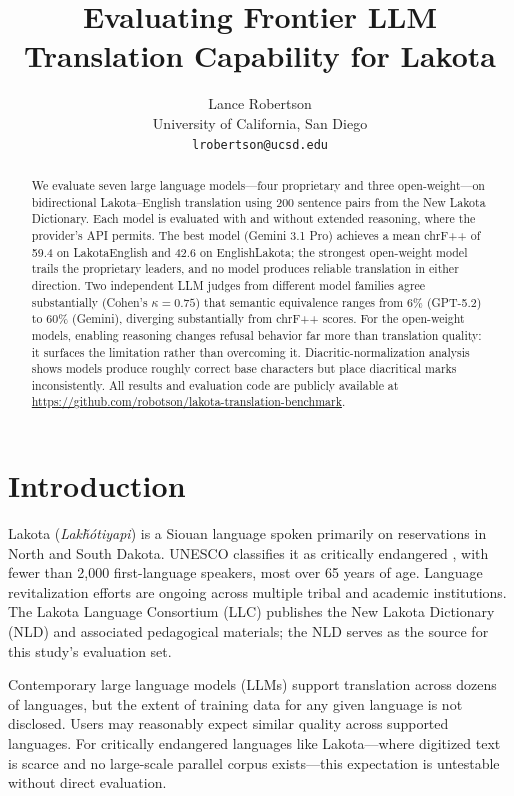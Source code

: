 \documentclass[11pt]{article}
\title{Evaluating Frontier LLM Translation Capability for Lakota}
\author{Lance Robertson \\
  University of California, San Diego \\
  \texttt{lrobertson@ucsd.edu}}
\newcommand{\lak}[1]{\textit{#1}}
\begin{document}
\maketitle

\begin{abstract}
We evaluate seven large language models---four proprietary and three open-weight---on bidirectional Lakota--English translation using 200 sentence pairs from the New Lakota Dictionary. Each model is evaluated with and without extended reasoning, where the provider's API permits. The best model (Gemini 3.1 Pro) achieves a mean chrF++ of 59.4 on Lakota\textrightarrow English and 42.6 on English\textrightarrow Lakota; the strongest open-weight model trails the proprietary leaders, and no model produces reliable translation in either direction. Two independent LLM judges from different model families agree substantially (Cohen's $\kappa=0.75$) that semantic equivalence ranges from 6\% (GPT-5.2) to 60\% (Gemini), diverging substantially from chrF++ scores. For the open-weight models, enabling reasoning changes refusal behavior far more than translation quality: it surfaces the limitation rather than overcoming it. Diacritic-normalization analysis shows models produce roughly correct base characters but place diacritical marks inconsistently. All results and evaluation code are publicly available at \url{https://github.com/robotson/lakota-translation-benchmark}.
\end{abstract}

\section{Introduction}

Lakota (\lak{Lakȟótiyapi}) is a Siouan language spoken primarily on reservations in North and South Dakota. UNESCO classifies it as critically endangered \cite{moseley}, with fewer than 2,000 first-language speakers, most over 65 years of age. Language revitalization efforts are ongoing across multiple tribal and academic institutions. The Lakota Language Consortium (LLC) publishes the New Lakota Dictionary (NLD) and associated pedagogical materials; the NLD serves as the source for this study's evaluation set.

Contemporary large language models (LLMs) support translation across dozens of languages, but the extent of training data for any given language is not disclosed. Users may reasonably expect similar quality across supported languages. For critically endangered languages like Lakota---where digitized text is scarce and no large-scale parallel corpus exists---this expectation is untestable without direct evaluation.
\end{document}
